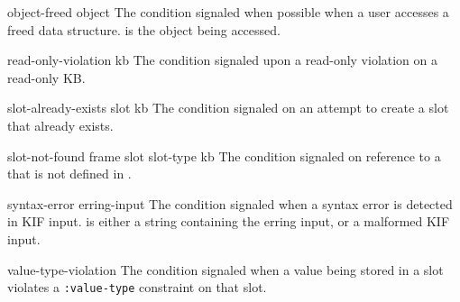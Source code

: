 \begin{okbccondition}{object-freed}{ object } {  }
The condition signaled when possible when a user accesses
   a freed data structure.   is the object being accessed.
\end{okbccondition}

\begin{okbccondition}{read-only-violation}{ kb } {  }
The condition signaled upon a read-only violation on a read-only KB.
\end{okbccondition}

\begin{okbccondition}{slot-already-exists}{ slot kb } {  }
The condition signaled on an attempt to create a slot that already 
    exists.
\end{okbccondition}

\begin{okbccondition}{slot-not-found}{ frame slot slot-type kb } {  }
The condition signaled on reference to a  that is not
    defined in .
\end{okbccondition}

\begin{okbccondition}{syntax-error}{ erring-input } {  }
The condition signaled when a syntax error is detected
   in KIF input.   is either a string containing 
   the erring input, or a malformed KIF input.
\end{okbccondition}

\begin{okbccondition}{value-type-violation}{  } {  }
The condition signaled when a value being stored in a slot violates a 
    {\tt :value-type} constraint on that slot.
\end{okbccondition}